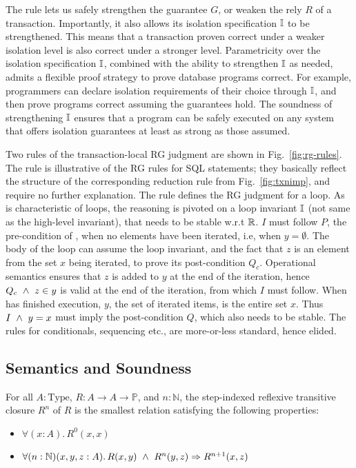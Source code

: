 The  rule lets us safely strengthen the guarantee
$G$, or weaken the rely $R$ of a transaction. Importantly, it also
allows its isolation specification $\mathbb{I}$ to be strengthened. This means
that a transaction proven correct under a weaker isolation level is
also correct under a stronger level. Parametricity over the isolation
specification $\mathbb{I}$, combined with the ability to strengthen $\mathbb{I}$ as
needed, admits a flexible proof strategy to prove database programs
correct. For example, programmers can declare isolation requirements
of their choice through $\mathbb{I}$, and then prove programs correct assuming
the guarantees hold. The soundness of strengthening $\mathbb{I}$ ensures that
a program can be safely executed on any system that offers isolation
guarantees at least as strong as those assumed.

Two rules of the transaction-local RG judgment are shown in
Fig.~\ref{fig:rg-rules}. The rule  is
illustrative of the RG rules for SQL statements; they basically
reflect the structure of the corresponding reduction rule from
Fig.~\ref{fig:txnimp}, and require no further explanation. The rule
 defines the RG judgment for a  loop.
As is characteristic of loops, the reasoning is pivoted on a loop
invariant $\mathbb{I}$ (not same as the high-level invariant), that needs to
be stable w.r.t $\mathbb{R}$. $I$ must follow $P$, the pre-condition of
, when no elements have been iterated, i.e, when
$y=\emptyset$. The body of the loop can assume the loop invariant, and
the fact that $z$ is an element from the set $x$ being iterated, to
prove its post-condition $Q_c$. Operational semantics ensures that $z$
is added to $y$ at the end of the iteration, hence $Q_c ~\wedge~ z\in y$
is valid at the end of the iteration, from which $I$ must follow. When
 has finished execution, $y$, the set of iterated items, is
the entire set $x$. Thus $I ~\wedge~ y=x$ must imply the post-condition
$Q$, which also needs to be stable. The rules for conditionals,
sequencing etc., are more-or-less standard, hence elided.

\subsection{Semantics and Soundness}

\begin{definition}
For all $A:\text{Type}$, $R: A \rightarrow A \rightarrow \mathbb{P}$, and $n :
\mathbb{N}$, the step-indexed reflexive transitive closure $R^n$ of $R$ is
the smallest relation satisfying the following
properties:
\begin{itemize}
\item $\forall (x:A).\, R^0 (x,x)$
\item $\forall (n:\mathbb{N})(x,y,z : A).\, R(x,y) ~\wedge~ R^n(y,z) \Rightarrow
R^{n+1}(x,z)$
\end{itemize}
\end{definition}

